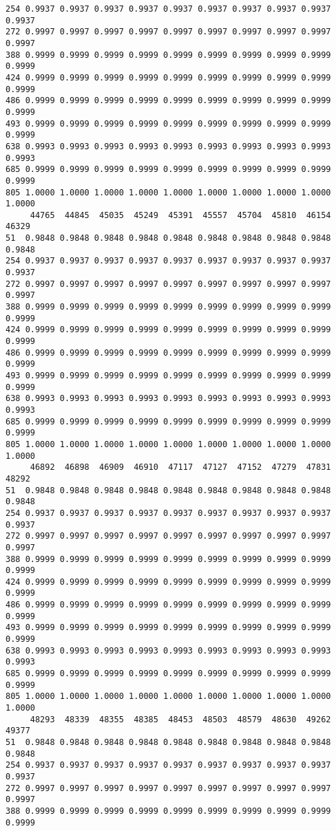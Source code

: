 \documentclass[
]{report}
\begin{document}
\begin{verbatim}
254 0.9937 0.9937 0.9937 0.9937 0.9937 0.9937 0.9937 0.9937 0.9937 0.9937
272 0.9997 0.9997 0.9997 0.9997 0.9997 0.9997 0.9997 0.9997 0.9997 0.9997
388 0.9999 0.9999 0.9999 0.9999 0.9999 0.9999 0.9999 0.9999 0.9999 0.9999
424 0.9999 0.9999 0.9999 0.9999 0.9999 0.9999 0.9999 0.9999 0.9999 0.9999
486 0.9999 0.9999 0.9999 0.9999 0.9999 0.9999 0.9999 0.9999 0.9999 0.9999
493 0.9999 0.9999 0.9999 0.9999 0.9999 0.9999 0.9999 0.9999 0.9999 0.9999
638 0.9993 0.9993 0.9993 0.9993 0.9993 0.9993 0.9993 0.9993 0.9993 0.9993
685 0.9999 0.9999 0.9999 0.9999 0.9999 0.9999 0.9999 0.9999 0.9999 0.9999
805 1.0000 1.0000 1.0000 1.0000 1.0000 1.0000 1.0000 1.0000 1.0000 1.0000
     44765  44845  45035  45249  45391  45557  45704  45810  46154  46329
51  0.9848 0.9848 0.9848 0.9848 0.9848 0.9848 0.9848 0.9848 0.9848 0.9848
254 0.9937 0.9937 0.9937 0.9937 0.9937 0.9937 0.9937 0.9937 0.9937 0.9937
272 0.9997 0.9997 0.9997 0.9997 0.9997 0.9997 0.9997 0.9997 0.9997 0.9997
388 0.9999 0.9999 0.9999 0.9999 0.9999 0.9999 0.9999 0.9999 0.9999 0.9999
424 0.9999 0.9999 0.9999 0.9999 0.9999 0.9999 0.9999 0.9999 0.9999 0.9999
486 0.9999 0.9999 0.9999 0.9999 0.9999 0.9999 0.9999 0.9999 0.9999 0.9999
493 0.9999 0.9999 0.9999 0.9999 0.9999 0.9999 0.9999 0.9999 0.9999 0.9999
638 0.9993 0.9993 0.9993 0.9993 0.9993 0.9993 0.9993 0.9993 0.9993 0.9993
685 0.9999 0.9999 0.9999 0.9999 0.9999 0.9999 0.9999 0.9999 0.9999 0.9999
805 1.0000 1.0000 1.0000 1.0000 1.0000 1.0000 1.0000 1.0000 1.0000 1.0000
     46892  46898  46909  46910  47117  47127  47152  47279  47831  48292
51  0.9848 0.9848 0.9848 0.9848 0.9848 0.9848 0.9848 0.9848 0.9848 0.9848
254 0.9937 0.9937 0.9937 0.9937 0.9937 0.9937 0.9937 0.9937 0.9937 0.9937
272 0.9997 0.9997 0.9997 0.9997 0.9997 0.9997 0.9997 0.9997 0.9997 0.9997
388 0.9999 0.9999 0.9999 0.9999 0.9999 0.9999 0.9999 0.9999 0.9999 0.9999
424 0.9999 0.9999 0.9999 0.9999 0.9999 0.9999 0.9999 0.9999 0.9999 0.9999
486 0.9999 0.9999 0.9999 0.9999 0.9999 0.9999 0.9999 0.9999 0.9999 0.9999
493 0.9999 0.9999 0.9999 0.9999 0.9999 0.9999 0.9999 0.9999 0.9999 0.9999
638 0.9993 0.9993 0.9993 0.9993 0.9993 0.9993 0.9993 0.9993 0.9993 0.9993
685 0.9999 0.9999 0.9999 0.9999 0.9999 0.9999 0.9999 0.9999 0.9999 0.9999
805 1.0000 1.0000 1.0000 1.0000 1.0000 1.0000 1.0000 1.0000 1.0000 1.0000
     48293  48339  48355  48385  48453  48503  48579  48630  49262  49377
51  0.9848 0.9848 0.9848 0.9848 0.9848 0.9848 0.9848 0.9848 0.9848 0.9848
254 0.9937 0.9937 0.9937 0.9937 0.9937 0.9937 0.9937 0.9937 0.9937 0.9937
272 0.9997 0.9997 0.9997 0.9997 0.9997 0.9997 0.9997 0.9997 0.9997 0.9997
388 0.9999 0.9999 0.9999 0.9999 0.9999 0.9999 0.9999 0.9999 0.9999 0.9999

\end{verbatim}
\end{document}
